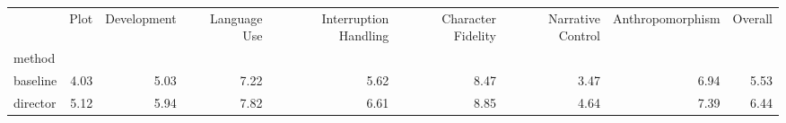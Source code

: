 \begin{tabular}{lrrrrrrrr}
\toprule
 & Plot & Development & Language Use & Interruption Handling & Character Fidelity & Narrative Control & Anthropomorphism & Overall \\
method &  &  &  &  &  &  &  &  \\
\midrule
baseline & 4.03 & 5.03 & 7.22 & 5.62 & 8.47 & 3.47 & 6.94 & 5.53 \\
director & 5.12 & 5.94 & 7.82 & 6.61 & 8.85 & 4.64 & 7.39 & 6.44 \\
\bottomrule
\end{tabular}
